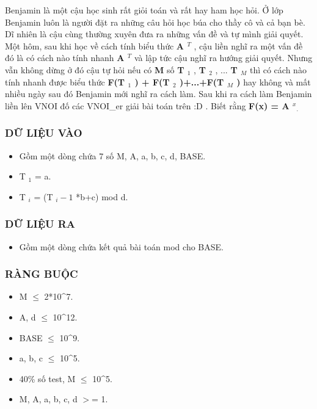 



   Benjamin là một cậu học sinh rất giỏi toán và rất hay ham học hỏi. Ở lớp Benjamin luôn là người đặt ra những câu hỏi học búa cho thầy cô và cả bạn bè. Dĩ nhiên là cậu cùng thường xuyên đưa ra những vấn đề và tự mình giải quyết. Một hôm, sau khi học về cách tính biểu thức   \textbf{    A    $^     T    $}   , cậu liền nghĩ ra một vấn đề đó là có cách nào tính nhanh   \textbf{    A    $^     T    $}   và lập tức cậu nghĩ ra hướng giải quyết. Nhưng vẫn không dừng ở đó cậu tự hỏi nếu có   \textbf{    M   }   số   \textbf{    T    $_     1    $}   ,   \textbf{    T    $_     2    $}   , ...   \textbf{    T    $_     M    $}   thì có cách nào tính nhanh được biểu thức   \textbf{    F(T    $_     1    $    ) + F(T    $_     2    $    )+...+F(T    $_     M    $    )   }   hay không và mất nhiều ngày sau đó Benjamin mới nghĩ ra cách làm. Sau khi ra cách làm Benjamin liền lên VNOI đố các VNOI\_er giải bài toán trên :D . Biết rằng   \textbf{    F(x) = A    $^     x    $}$_    .   $

\subsubsection{   DỮ LIỆU VÀO  }


\begin{itemize}
	\item     Gồm một dòng chứa 7 số M, A, a, b, c, d, BASE.   
	\item     T    $_     1    $    = a.   
	\item     T    $_     i    $    = (T    $_     i-1    $    *b+c) mod d.   
\end{itemize}



\subsubsection{   DỮ LIỆU RA  }
\begin{itemize}
	\item     Gồm một dòng chứa kết quả bài toán mod cho BASE.   
\end{itemize}

\subsubsection{   RÀNG BUỘC  }


\begin{itemize}
	\item     M  $\le$  2*10\textasciicircum7.   
	\item     A, d  $\le$  10\textasciicircum12.   
	\item     BASE  $\le$  10\textasciicircum9.   
	\item     a, b, c  $\le$  10\textasciicircum5.   
	\item     40\% số test, M  $\le$  10\textasciicircum5.   
	\item     M, A, a, b, c, d $>$= 1.   
\end{itemize}



